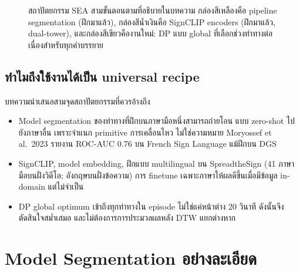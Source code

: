 \documentclass[11pt,a4paper]{article}
\def\textbf#1{#1}%
\def\emph#1{#1}%
\begin{document}
\begin{figure}[h]
\caption{สถาปัตยกรรม SEA สามขั้นตอนตามที่อธิบายในบทความ
กล่องสีเหลืองคือ pipeline segmentation (ฝึกมาแล้ว),
กล่องสีน้ำเงินคือ SignCLIP encoders (ฝึกมาแล้ว, dual-tower),
และกล่องสีเขียวคืองานใหม่: DP แบบ global ที่เลือกช่วงท่าทางต่อเนื่องสำหรับทุกคำบรรยาย}
\label{fig:sea-arch}
\end{figure}

\subsection{ทำไมถึงใช้งานได้เป็น universal recipe}
บทความนำเสนอสามจุดสถาปัตยกรรมที่ควรอ้างถึง
\begin{itemize}[leftmargin=1.5em]
  \item Model \emph{segmentation} ของท่าทางที่ฝึกบนภาษามือหนึ่งสามารถถ่ายโอน
        แบบ zero-shot ไปยังภาษาอื่น เพราะจำแนก primitive การเคลื่อนไหว
        ไม่ใช่ความหมาย Moryossef et al.\ 2023 รายงาน ROC-AUC 0.76
        บน French Sign Language แม้ฝึกบน DGS
  \item SignCLIP, model embedding, ฝึกแบบ \emph{multilingual}
        บน SpreadtheSign (41 ภาษามือบนฝั่งวิดีโอ; อังกฤษบนฝั่งข้อความ)
        การ finetune เฉพาะภาษาให้ผลดีขึ้นเมื่อมีข้อมูล in-domain
        แต่ไม่จำเป็น
  \item DP \emph{global} optimum เข้าถึงทุกท่าทางใน episode
        ไม่ใช่แค่หน้าต่าง 20 วินาที ดังนั้นจึงตัดสินใจสม่ำเสมอ
        และไม่ต้องการการประมวลผลหลัง DTW แยกต่างหาก
\end{itemize}


\section{Model Segmentation อย่างละเอียด}
\label{sec:paper-seg}
\end{document}
